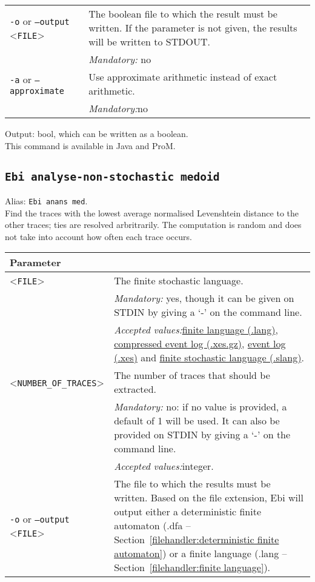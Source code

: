 {\begin{tabularx}{\linewidth}{lX}
\texttt{-o} or \texttt{--output} <\texttt{FILE}> &
The boolean file to which the result must be written. If the parameter is not given, the results will be written to STDOUT.\\
&\textit{Mandatory:} \quad no\\
\texttt{-a} or \texttt{--approximate} & Use approximate arithmetic instead of exact arithmetic.\\
&\textit{Mandatory:}\quad no\\
\bottomrule
\end{tabularx}
\noindent Output: bool, which can be written as a boolean.
\\This command is available in Java and ProM.
\subsection{\texttt{Ebi analyse-non-stochastic medoid}}
\label{command:Ebi analyse-non-stochastic medoid}
Alias: \texttt{Ebi anans med}.\\
Find the traces with the lowest average normalised Levenshtein distance to the other traces; ties are resolved arbritrarily. The computation is random and does not take into account how often each trace occurs.\\
\begin{tabularx}{\linewidth}{lX}
\toprule
Parameter \\\midrule
<\texttt{FILE}>&The finite stochastic language.\\
&\textit{Mandatory:} \quad yes, though it can be given on STDIN by giving a `-' on the command line.\\
&\textit{Accepted values:}\quad \hyperref[filehandler:finite language]{finite language (.lang)}, \hyperref[filehandler:compressed event log]{compressed event log (.xes.gz)}, \hyperref[filehandler:event log]{event log (.xes)} and \hyperref[filehandler:finite stochastic language]{finite stochastic language (.slang)}.\\
<\texttt{NUMBER\_OF\_TRACES}>&The number of traces that should be extracted.\\
&\textit{Mandatory:} \quad no: if no value is provided, a default of 1 will be used. It can also be provided on STDIN by giving a `-' on the command line.\\
&\textit{Accepted values:}\quad integer.\\
\texttt{-o} or \texttt{--output} <\texttt{FILE}> &
The file to which the results must be written. Based on the file extension, Ebi will output either a deterministic finite automaton (.dfa -- Section~\ref{filehandler:deterministic finite automaton}) or a finite language (.lang -- Section~\ref{filehandler:finite language}).

\end{tabularx}}

